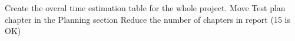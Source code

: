 \nextItem Create the overal time estimation table for the whole project.
\nextItem Move Test plan chapter in the Planning section
\nextItem Reduce the number of chapters in report (15 is OK)

